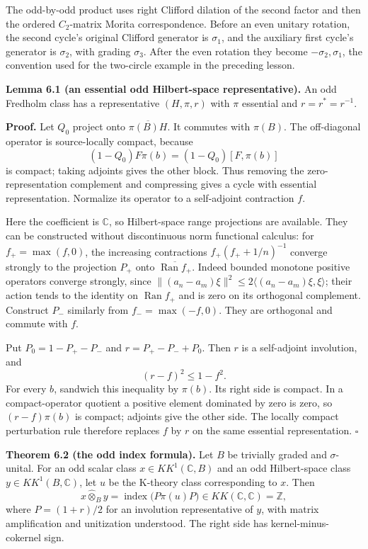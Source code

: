 \documentclass[
  11pt,
]{article}
\begin{document}
The odd-by-odd product uses right Clifford dilation of the second factor
and then the ordered \(C_2\)-matrix Morita correspondence. Before an
even unitary rotation, the second cycle's original Clifford generator is
\(\sigma_1\), and the auxiliary first cycle's generator is \(\sigma_2\),
with grading \(\sigma_3\). After the even rotation they become
\(-\sigma_2,\sigma_1\), the convention used for the two-circle example
in the preceding lesson.

\textbf{Lemma 6.1 (an essential odd Hilbert-space representative).} An
odd Fredholm class has a representative \((H,\pi,r)\) with \(\pi\)
essential and \(r=r^*=r^{-1}\).

\textbf{Proof.} Let \(Q_0\) project onto \(\overline{\pi(B)H}\). It
commutes with \(\pi(B)\). The off-diagonal operator is source-locally
compact, because \[
(1-Q_0)F\pi(b)=(1-Q_0)[F,\pi(b)]
\] is compact; taking adjoints gives the other block. Thus removing the
zero-representation complement and compressing gives a cycle with
essential representation. Normalize its operator to a self-adjoint
contraction \(f\).

Here the coefficient is \(\mathbb C\), so Hilbert-space range
projections are available. They can be constructed without discontinuous
norm functional calculus: for \(f_+=\max(f,0)\), the increasing
contractions \(f_+(f_++1/n)^{-1}\) converge strongly to the projection
\(P_+\) onto \(\overline{\operatorname{Ran}f_+}\). Indeed bounded
monotone positive operators converge strongly, since
\(\|(a_n-a_m)\xi\|^2\leq2\langle(a_n-a_m)\xi,\xi\rangle\); their action
tends to the identity on \(\operatorname{Ran}f_+\) and is zero on its
orthogonal complement. Construct \(P_-\) similarly from
\(f_-=\max(-f,0)\). They are orthogonal and commute with \(f\).

Put \(P_0=1-P_+-P_-\) and \(r=P_+-P_-+P_0\). Then \(r\) is a
self-adjoint involution, and \[
(r-f)^2\leq1-f^2.
\] For every \(b\), sandwich this inequality by \(\pi(b)\). Its right
side is compact. In a compact-operator quotient a positive element
dominated by zero is zero, so \((r-f)\pi(b)\) is compact; adjoints give
the other side. The locally compact perturbation rule therefore replaces
\(f\) by \(r\) on the same essential representation. \(\square\)

\textbf{Theorem 6.2 (the odd index formula).} Let \(B\) be trivially
graded and \(\sigma\)-unital. For an odd scalar class
\(x\in KK^1(\mathbb C,B)\) and an odd Hilbert-space class
\(y\in KK^1(B,\mathbb C)\), let \(u\) be the K-theory class
corresponding to \(x\). Then \[
x\widehat\otimes_B y
=\operatorname{index}\bigl(P\pi(u)P\bigr)
\in KK(\mathbb C,\mathbb C)=\mathbb Z,
\tag{6.1}
\] where \(P=(1+r)/2\) for an involution representative of \(y\), with
matrix amplification and unitization understood. The right side has
kernel-minus-cokernel sign.
\end{document}
